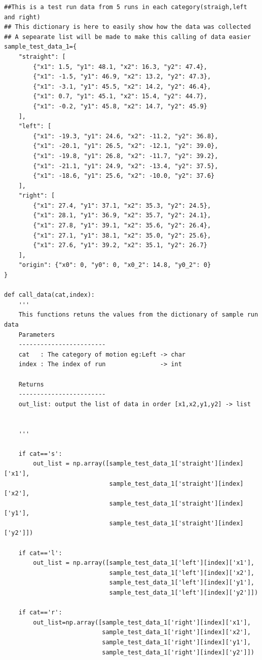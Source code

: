 {\begin{itemize}
\begin{verbatim}
##This is a test run data from 5 runs in each category(straigh,left and right)
## This dictionary is here to easily show how the data was collected 
## A sepearate list will be made to make this calling of data easier
sample_test_data_1={
    "straight": [
        {"x1": 1.5, "y1": 48.1, "x2": 16.3, "y2": 47.4},
        {"x1": -1.5, "y1": 46.9, "x2": 13.2, "y2": 47.3},
        {"x1": -3.1, "y1": 45.5, "x2": 14.2, "y2": 46.4},
        {"x1": 0.7, "y1": 45.1, "x2": 15.4, "y2": 44.7},
        {"x1": -0.2, "y1": 45.8, "x2": 14.7, "y2": 45.9}
    ],
    "left": [
        {"x1": -19.3, "y1": 24.6, "x2": -11.2, "y2": 36.8},
        {"x1": -20.1, "y1": 26.5, "x2": -12.1, "y2": 39.0},
        {"x1": -19.8, "y1": 26.8, "x2": -11.7, "y2": 39.2},
        {"x1": -21.1, "y1": 24.9, "x2": -13.4, "y2": 37.5},
        {"x1": -18.6, "y1": 25.6, "x2": -10.0, "y2": 37.6}
    ],
    "right": [
        {"x1": 27.4, "y1": 37.1, "x2": 35.3, "y2": 24.5},
        {"x1": 28.1, "y1": 36.9, "x2": 35.7, "y2": 24.1},
        {"x1": 27.8, "y1": 39.1, "x2": 35.6, "y2": 26.4},
        {"x1": 27.1, "y1": 38.1, "x2": 35.0, "y2": 25.6},
        {"x1": 27.6, "y1": 39.2, "x2": 35.1, "y2": 26.7}
    ],
    "origin": {"x0": 0, "y0": 0, "x0_2": 14.8, "y0_2": 0}
}

def call_data(cat,index):
    '''
    This functions retuns the values from the dictionary of sample run data
    Parameters
    ------------------------
    cat   : The category of motion eg:Left -> char
    index : The index of run               -> int
    
    Returns
    ------------------------
    out_list: output the list of data in order [x1,x2,y1,y2] -> list
    
    
    '''
    
    if cat=='s':
        out_list = np.array([sample_test_data_1['straight'][index]['x1'],
                             sample_test_data_1['straight'][index]['x2'],
                             sample_test_data_1['straight'][index]['y1'],
                             sample_test_data_1['straight'][index]['y2']])
        
    if cat=='l':
        out_list = np.array([sample_test_data_1['left'][index]['x1'],
                             sample_test_data_1['left'][index]['x2'],
                             sample_test_data_1['left'][index]['y1'],
                             sample_test_data_1['left'][index]['y2']])
        
    if cat=='r':
        out_list=np.array([sample_test_data_1['right'][index]['x1'],
                           sample_test_data_1['right'][index]['x2'],
                           sample_test_data_1['right'][index]['y1'],
                           sample_test_data_1['right'][index]['y2']])
    

\end{verbatim}
\end{itemize}}
